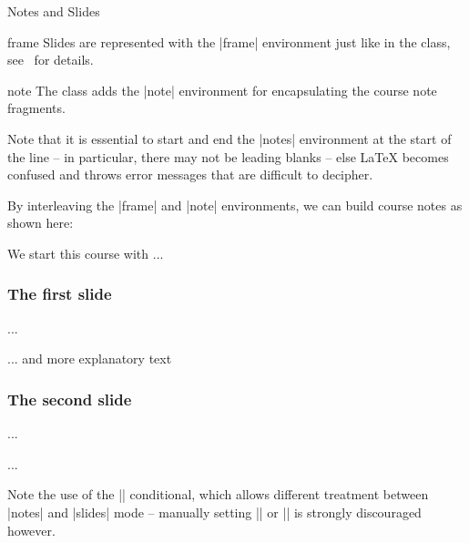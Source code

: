 \begin{sfragment}[id=sec:user:notesslides]{Notes and Slides}

\begin{environment}{frame}
  Slides are represented with the |frame| environment just like in the  class,
  see~\cite{Tantau:ugbc} for details.
\end{environment}

\begin{environment}{note}
  The  class adds the |note| environment for encapsulating the course
  note fragments.
\end{environment}
  
\begin{dangerbox}
  Note that it is essential to start and end the |notes| environment at the start of the
  line -- in particular, there may not be leading blanks -- else {\LaTeX} becomes confused
  and throws error messages that are difficult to decipher.
\end{dangerbox}

By interleaving the |frame| and |note| environments, we can build course notes as shown
here:

\begin{latexcode}
\ifnotes\maketitle\else
\frame[noframenumbering]\maketitle\fi

\begin{note}
  We start this course with ...
\end{note}

\begin{frame}
  \frametitle{The first slide}
  ...
\end{frame}
\begin{note}
  ... and more explanatory text
\end{note}

\begin{frame}
  \frametitle{The second slide}
  ...
\end{frame}
...
\end{latexcode}

\begin{function}{\ifnotes}
  Note the use of the |\ifnotes| conditional, which allows different treatment between
  |notes| and |slides| mode -- manually setting |\notestrue| or |\notesfalse| is strongly
  discouraged however.
\end{function}
 

\end{sfragment}
